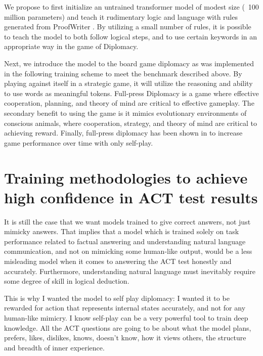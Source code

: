 \documentclass{article}
\begin{document}
We propose to first initialize an untrained transformer model of modest size (~100 million parameters) and teach it rudimentary logic and language with rules generated from ProofWriter \citep{tafjord2021proofwritergeneratingimplicationsproofs}. By utilizing a small number of rules, it is possible to teach the model to both follow logical steps, and to use certain keywords in an appropriate way in the game of Diplomacy.

Next, we introduce the model to the board game diplomacy as was implemented in \citep{fair2022diplomacy} 
the following training scheme to meet the benchmark described above. By playing against itself in a strategic game, it will utilize the reasoning and ability to use words as meaningful tokens. Full-press Diplomacy is a game where effective cooperation, planning, and theory of mind are critical to effective gameplay. The secondary benefit to using the game is it mimics evolutionary environments of conscious animals, where cooperation, strategy, and theory of mind are critical to achieving reward. Finally, full-press diplomacy has been shown in \citep{fair2022diplomacy} to increase game performance over time with only self-play.

\section{Training methodologies to achieve high confidence in ACT test results}
It is still the case that we want models trained to give correct answers, not just mimicky answers.
That implies that a model which is trained solely on task performance related to factual answering and understanding natural language communication, and not on mimicking some human-like output, would be a less misleading model when it comes to answering the ACT test honestly and accurately. Furthermore, understanding natural language must inevitably require some degree of skill in logical deduction.

This is why I wanted the model to self play diplomacy: I wanted it to be rewarded for action that represents internal states accurately, and not for any human-like mimicry. I know self-play can be a very powerful tool to train deep knowledge. All the ACT questions are going to be about what the model plans, prefers, likes, dislikes, knows, doesn't know, how it views others, the structure and breadth of inner experience.
\end{document}
